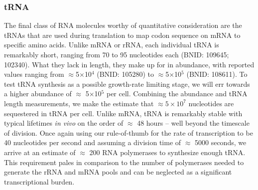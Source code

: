 \subsubsection{tRNA}
The final class of RNA molecules worthy of quantitative consideration are the
tRNAs that are used during translation to map codon sequence on mRNA to specific amino acids.
Unlike mRNA or rRNA, each individual tRNA is remarkably short, ranging
from 70 to 95 nucleotides each (BNID: 109645; 102340). What
they lack in length, they make up for in abundance, with reported values ranging from
$\approx$5$\times$10$^4$ (BNID: 105280) to
$\approx$5$\times$10$^5$ (BNID: 108611). To test tRNA synthesis as a possible
growth-rate limiting stage, we will err towards a higher abundance of $\approx$
5$\times$10$^5$ per cell. Combining the abundance and tRNA length measurements,
we make the estimate that $\approx 5 \times 10^7$ nucleotides are sequestered in tRNA per cell.
Unlike mRNA, tRNA is remarkably stable with typical lifetimes \textit{in vivo}
on the order of $\approx$ 48 hours \citep{abelson1974,svenningsen2017} -- well
beyond the timescale of division. Once again using our rule-of-thumb for the
rate of transcription to be 40 nucleotides per second and assuming a division
time of $\approx$ 5000 seconds, we arrive at an estimate of $\approx$ 200 RNA
polymerases to synthesize enough tRNA. This requirement pales in comparison to
the number of polymerases needed to generate the rRNA and mRNA pools and can be
neglected as a significant transcriptional burden.

